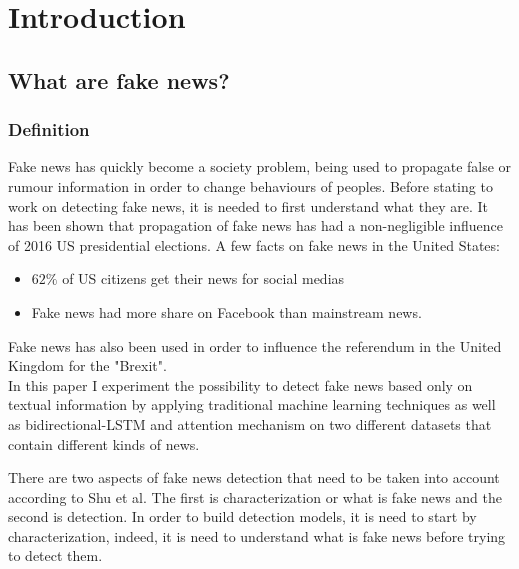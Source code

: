 \chapter{Introduction} \label{section:intro}
\section{What are fake news?}
\subsection{Definition}
Fake news has quickly become a society problem, being used to propagate false or rumour information in order to change behaviours of peoples. Before stating to work on detecting fake news, it is needed to first understand what they are. It has been shown that propagation of fake news has had a non-negligible influence of 2016 US presidential elections\cite{Allcott2017}. A few facts on fake news in the United States: 

\begin{itemize}
 \item $62\%$ of US citizens get their news for social medias\cite{gottfried2016news}
 \item Fake news had more share on Facebook than mainstream news\cite{silverman2016teens}.
\end{itemize}

Fake news has also been used in order to influence the referendum in the United Kingdom for the "Brexit". \\

In this paper I experiment the possibility to detect fake news based only on textual information by applying traditional machine learning techniques\cite{Fan2008LIBLINEARAL,Robertson2004,zhang_optimality_nodate} as well as bidirectional-LSTM\cite{Hochreiter1997LongSM} and attention mechanism\cite{zhou-etal-2016-attention} on two different datasets that contain different kinds of news.

There are two aspects of fake news detection that need to be taken into account according to Shu et al\cite{shu2017fake}. The first is characterization or what is fake news and the second is detection. In order to build detection models, it is need to start by characterization, indeed, it is need to understand what is fake news before trying to detect them. \\

